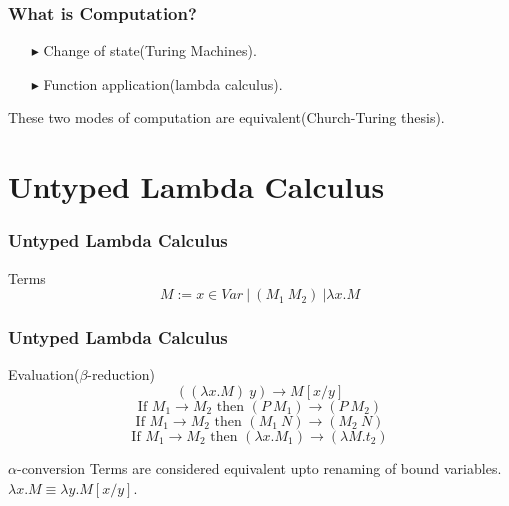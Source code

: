 \documentclass[14pt,compress]{beamer}
\begin{document}

\begin{frame}\label{frame : what is computation}

\frametitle{What is Computation?}
\begin{enumerate}
\pause
\item[$\blacktriangleright$] Change of state(Turing Machines).
\pause
\item[$\blacktriangleright$] Function application(lambda calculus). 
\end{enumerate}
\pause
\textcolor{beamer@mathtext}{These two modes of computation are equivalent(Church-Turing thesis).}

\end{frame}

\section{Untyped Lambda Calculus}
\begin{frame}\label{frame : terms of lambda calculus}

\frametitle{Untyped Lambda Calculus}

\pause
\begin{block}{Terms}
\[ M := x \in Var\ |\ (M_1\ M_2)\ | \lambda x . M \]
\end{block}
\end{frame}


\begin{frame}\label{frame : rules of lambda calculus}

\frametitle{Untyped Lambda Calculus}
\begin{block}{Evaluation($\beta$-reduction)}
\[ ((\lambda x.M)\ y) \to M[x/y] \]
\[ \text{If }M_1 \to M_2 \text{ then }(P\ M_1) \to (P\ M_2) \]
\[ \text{If }M_1 \to M_2 \text{ then }(M_1\ N) \to (M_2\ N) \]
\[ \text{If }M_1 \to M_2 \text{ then }(\lambda x.M_1) \to (\lambda M. t_2) \]
\end{block}
\pause
\begin{block}{$\alpha$-conversion}
Terms are considered equivalent upto renaming of bound variables.
$\lambda x.M \equiv \lambda y.M[x/y]$.
\end{block}
\end{frame}
\end{document}
